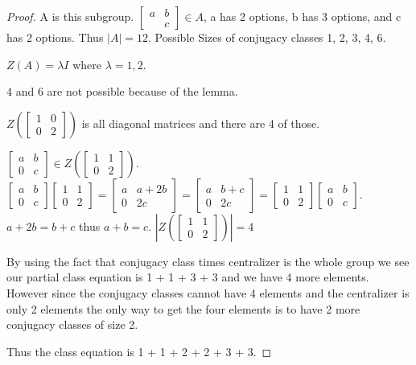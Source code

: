\documentclass{article}
\begin{document}
\begin{proof}
    A is this subgroup. $\begin{bmatrix}
        a & b \\ & c
    \end{bmatrix} \in A$, a has 2 options, b has 3 options, and c has 2 options. Thus $|A| = 12$. Possible Sizes of conjugacy classes 1, 2, 3, 4, 6. 

    $Z(A) = \lambda I$ where $\lambda = 1, 2$.

    4 and 6 are not possible because of the lemma. 

    $Z(\begin{bmatrix}
        1 & 0 \\ 0 & 2
    \end{bmatrix})$ is all diagonal matrices and there are 4 of those.

    $\begin{bmatrix}
        a & b \\ 0 & c
    \end{bmatrix} \in Z(\begin{bmatrix}
        1 & 1 \\ 0 & 2
    \end{bmatrix})$. $\begin{bmatrix}
        a & b \\ 0 & c
    \end{bmatrix}\begin{bmatrix}
        1 & 1 \\ 0 & 2
    \end{bmatrix} = \begin{bmatrix}
        a & a + 2b \\ 0 & 2c
    \end{bmatrix} = \begin{bmatrix}
        a & b + c \\ 0 & 2c
    \end{bmatrix}= \begin{bmatrix}
        1 & 1 \\ 0 & 2
    \end{bmatrix}\begin{bmatrix}
        a & b \\ 0 & c
    \end{bmatrix}$. $a + 2b = b + c$ thus $a + b = c$. $|Z(\begin{bmatrix}
        1 & 1 \\ 0 & 2
    \end{bmatrix})| = 4$

    By using the fact that conjugacy class times centralizer is the whole group we see our partial class equation is 1 + 1 + 3 + 3 and we have 4 more elements. However since the conjugacy classes cannot have 4 elements and the centralizer is only 2 elements the only way to get the four elements is to have 2 more conjugacy classes of size 2.

    Thus the class equation is 1 + 1 + 2 + 2 + 3 + 3.
\end{proof}
\end{document}
